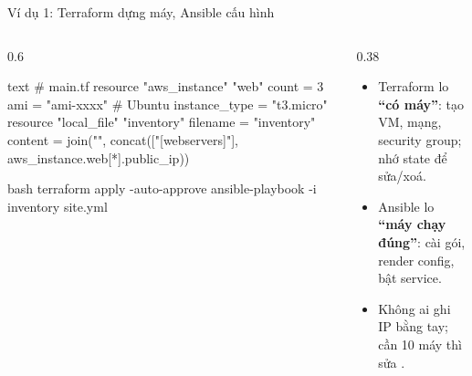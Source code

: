 \documentclass[aspectratio=169,11pt,xcolor=table]{beamer}
\begin{document}
\begin{frame}[fragile]{Ví dụ 1: Terraform dựng máy, Ansible cấu hình}
  \centering
  \par\vspace{0.2cm}
  \begin{columns}[t]
    \begin{column}{0.6\textwidth}
\begin{codeblock}[minted options={fontsize=\tiny}]{text}
# main.tf
resource "aws_instance" "web" {
  count         = 3
  ami           = "ami-xxxx"      # Ubuntu
  instance_type = "t3.micro"
}
resource "local_file" "inventory" {
  filename = "inventory"
  content  = join("\n", concat(["[webservers]"],
               aws_instance.web[*].public_ip))
}
\end{codeblock}
\begin{codeblock}[minted options={fontsize=\tiny}]{bash}
terraform apply -auto-approve
ansible-playbook -i inventory site.yml
\end{codeblock}
    \end{column}
    \begin{column}{0.38\textwidth}
      \raggedright
      \begin{itemize}\small\setlength{\itemsep}{0.25cm}
        \item Terraform lo \textbf{``có máy''}: tạo VM, mạng, security group; nhớ state để
              sửa/xoá.
        \item Ansible lo \textbf{``máy chạy đúng''}: cài gói, render config, bật service.
        \item Không ai ghi IP bằng tay; cần 10 máy thì sửa .
      \end{itemize}
    \end{column}
  \end{columns}
\end{frame}
\end{document}
